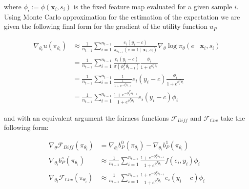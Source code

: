 \documentclass[
	a4paper,
	11pt
	]{article}
\begin{document}
where $\phi_i := \phi(\boldsymbol{x}_i, s_i)$ is the fixed feature map evaluated for a given sample $i$. Using Monte Carlo approximation for the estimation of the expectation we are given the following final form for the gradient of the utility function $u_P$

\begin{align*}
    \nabla_{\theta_t}u(\pi_{\theta_i}) &\approx \frac{1}{n_{t-1}} \sum_{i=1}^{n_{t-1}} \frac{e_i(y_i - c)}{\pi_{\theta_{t-1}}(e = 1 \mid \boldsymbol{x}_i, s_i)}\nabla_{\theta} \log \pi_\theta(e \mid \boldsymbol{x}_i, s_i) \\
    &= \frac{1}{n_{t-1}} \sum_{i=1}^{n_{t-1}} \frac{e_i(y_i - c)}{\sigma(\phi_i^T\theta_{t-1})} \frac{\phi_i}{1 + e^{\phi_i^T\theta_t}} \\
    &= \frac{1}{n_{t-1}} \sum_{i=1}^{n_{t-1}} \frac{1}{\frac{1}{1 + e^{-\phi_i^T\theta_{t-1}}}} e_i(y_i - c) \frac{\phi_i}{1 + e^{\phi_i^T\theta_t}} \\
    &= \frac{1}{n_{t-1}} \sum_{i=1}^{n_{t-1}} \frac{1 + e^{-\phi_i^T\theta_{t-1}}}{1 + e^{\phi_i^T\theta_t}} e_i(y_i - c)\phi_i 
\end{align*}

and with an equivalent argument the fairness functions $\mathcal{F}_{Diff}$ and $\mathcal{F}_{Cov}$ take the following form:

\begin{align*}
    \nabla_{\theta}\mathcal{F}_{Diff}(\pi_{\theta_i}) &= \nabla_{\theta_i}b_P^0(\pi_{\theta_i}) - \nabla_{\theta_i}b_P^1(\pi_{\theta_i}) \\
    \nabla_{\theta_i}b_P^s(\pi_{\theta_i}) &\approx \frac{1}{n_{t-1}} \sum_{i=1}^{n_{t-1}} \frac{1 + e^{-\phi_i^T\theta_{t-1}}}{1 + e^{\phi_i^T\theta_t}} f(e_i, y_i)\phi_i \\
    \nabla_{\theta_t}\mathcal{F}_{Cov}(\pi_{\theta_i}) &\approx \frac{1}{n_{t-1}} \sum_{i=1}^{n_{t-1}} \frac{1 + e^{-\phi_i^T\theta_{t-1}}}{1 + e^{\phi_i^T\theta_t}} e_i(y_i - c)\phi_i 
\end{align*}


 

\end{document}
